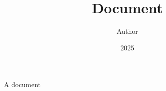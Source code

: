 \documentclass[12pt]{extarticle}
\title{Document}
\author{Author}
\date{2025}
\begin{document}
\firstpage
A document
\end{document}
